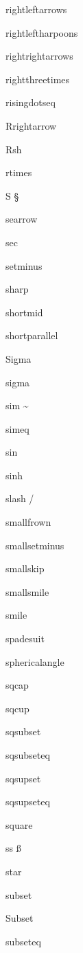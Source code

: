 \documentclass{article}
\begin{document}
rightleftarrows    \rightleftarrows{}

rightleftharpoons    \rightleftharpoons{}

rightrightarrows    \rightrightarrows{}

rightthreetimes    \rightthreetimes{}

risingdotseq    \risingdotseq{}

Rrightarrow    \Rrightarrow{}

Rsh    \Rsh{}

rtimes    \rtimes{}


S    \S{}

searrow    \searrow{}

sec    \sec{}

setminus    \setminus{}

sharp    \sharp{}

shortmid    \shortmid{}

shortparallel    \shortparallel{}

Sigma    \Sigma{}

sigma    \sigma{}

sim    \sim{}

simeq    \simeq{}

sin    \sin{}

sinh    \sinh{}

slash    \slash{}

smallfrown    \smallfrown{}

smallsetminus    \smallsetminus{}

smallskip    \smallskip{}

smallsmile    \smallsmile{}

smile    \smile{}

spadesuit    \spadesuit{}

sphericalangle    \sphericalangle{}

sqcap    \sqcap{}

sqcup    \sqcup{}

sqsubset    \sqsubset{}

sqsubseteq    \sqsubseteq{}

sqsupset    \sqsupset{}

sqsupseteq    \sqsupseteq{}

square    \square{}

ss    \ss{}

star    \star{}

subset    \subset{}

Subset    \Subset{}

subseteq    \subseteq{}
\end{document}
